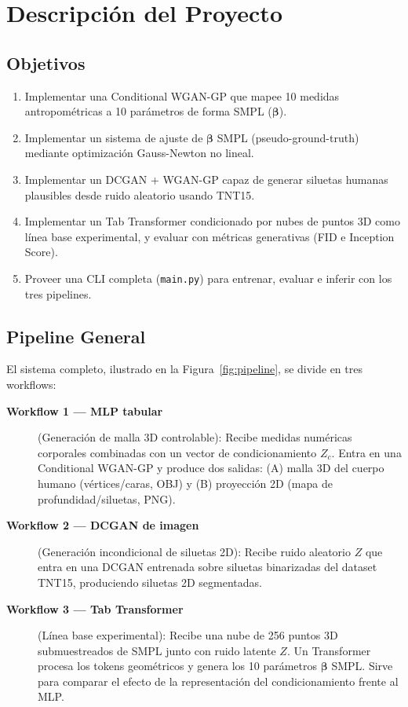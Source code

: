 \documentclass[a4paper,11pt]{article}
\begin{document}
\section{Descripción del Proyecto}

\subsection{Objetivos}

\begin{enumerate}
    \item Implementar una Conditional WGAN-GP que mapee 10 medidas
          antropométricas a 10 parámetros de forma SMPL ($\bm{\beta}$).
    \item Implementar un sistema de ajuste de $\bm{\beta}$ SMPL
          (pseudo-ground-truth) mediante optimización Gauss-Newton no lineal.
    \item Implementar un DCGAN + WGAN-GP capaz de generar siluetas humanas
          plausibles desde ruido aleatorio usando TNT15.
    \item Implementar un Tab Transformer condicionado por nubes de puntos
          3D como línea base experimental, y evaluar con métricas
          generativas (FID e Inception Score).
    \item Proveer una CLI completa (\texttt{main.py}) para entrenar, evaluar
          e inferir con los tres pipelines.
\end{enumerate}

\subsection{Pipeline General}

El sistema completo, ilustrado en la Figura~\ref{fig:pipeline}, se divide en
tres workflows:

\begin{description}
    \item[\textbf{Workflow 1 — MLP tabular}] (Generación de malla 3D controlable):
          Recibe medidas numéricas corporales combinadas con un vector de
          condicionamiento $Z_c$. Entra en una Conditional WGAN-GP y produce
          dos salidas: (A) malla 3D del cuerpo humano (vértices/caras, OBJ)
          y (B) proyección 2D (mapa de profundidad/siluetas, PNG).
    \item[\textbf{Workflow 2 — DCGAN de imagen}] (Generación incondicional de siluetas 2D):
          Recibe ruido aleatorio $Z$ que entra en una DCGAN entrenada sobre
          siluetas binarizadas del dataset TNT15, produciendo siluetas 2D
          segmentadas.
    \item[\textbf{Workflow 3 — Tab Transformer}] (Línea base experimental):
          Recibe una nube de 256 puntos 3D submuestreados de SMPL junto con
          ruido latente $Z$. Un Transformer procesa los tokens geométricos
          y genera los 10 parámetros $\bm{\beta}$ SMPL. Sirve para comparar
          el efecto de la representación del condicionamiento frente al MLP.
\end{description}
\end{document}

